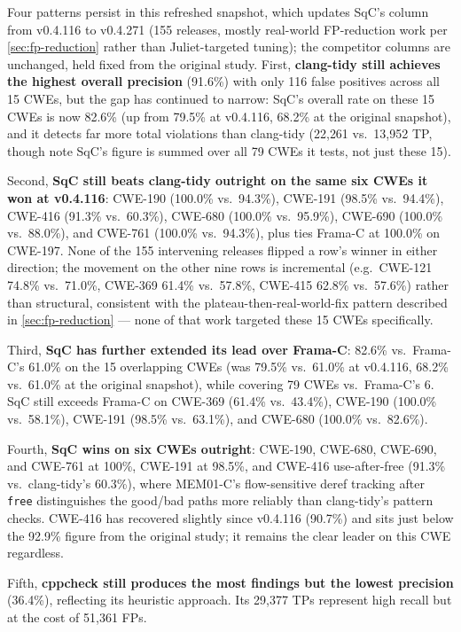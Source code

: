 Four patterns persist in this refreshed snapshot, which updates SqC's
column from v0.4.116 to v0.4.271 (155 releases, mostly real-world
FP-reduction work per \cref{sec:fp-reduction} rather than
Juliet-targeted tuning); the competitor columns are unchanged, held
fixed from the original study.  First, \textbf{clang-tidy still
achieves the highest overall precision} (91.6\%) with only 116 false
positives across all 15 CWEs, but the gap has continued to narrow:
SqC's overall rate on these 15 CWEs is now 82.6\% (up from 79.5\% at
v0.4.116, 68.2\% at the original snapshot), and it detects far more
total violations than clang-tidy (22{,}261 vs.\ 13{,}952 TP, though
note SqC's figure is summed over all 79 CWEs it tests, not just these
15).

Second, \textbf{SqC still beats clang-tidy outright on the same six
CWEs it won at v0.4.116}: CWE-190 (100.0\% vs.\ 94.3\%), CWE-191
(98.5\% vs.\ 94.4\%), CWE-416 (91.3\% vs.\ 60.3\%), CWE-680 (100.0\%
vs.\ 95.9\%), CWE-690 (100.0\% vs.\ 88.0\%), and CWE-761 (100.0\% vs.\
94.3\%), plus ties Frama-C at 100.0\% on CWE-197.  None of the 155
intervening releases flipped a row's winner in either direction; the
movement on the other nine rows is incremental (e.g.\ CWE-121 74.8\%
vs.\ 71.0\%, CWE-369 61.4\% vs.\ 57.8\%, CWE-415 62.8\% vs.\ 57.6\%)
rather than structural, consistent with the plateau-then-real-world-fix
pattern described in \cref{sec:fp-reduction} --- none of that work
targeted these 15 CWEs specifically.

Third, \textbf{SqC has further extended its lead over Frama-C}: 82.6\%
vs.\ Frama-C's 61.0\% on the 15 overlapping CWEs (was 79.5\% vs.\
61.0\% at v0.4.116, 68.2\% vs.\ 61.0\% at the original snapshot), while
covering 79 CWEs vs.\ Frama-C's 6.  SqC still exceeds Frama-C on
CWE-369 (61.4\% vs.\ 43.4\%), CWE-190 (100.0\% vs.\ 58.1\%), CWE-191
(98.5\% vs.\ 63.1\%), and CWE-680 (100.0\% vs.\ 82.6\%).

Fourth, \textbf{SqC wins on six CWEs outright}: CWE-190, CWE-680,
CWE-690, and CWE-761 at 100\%, CWE-191 at 98.5\%, and CWE-416
use-after-free (91.3\% vs.\ clang-tidy's 60.3\%), where MEM01-C's
flow-sensitive deref tracking after \texttt{free} distinguishes the
good/bad paths more reliably than clang-tidy's pattern checks.
CWE-416 has recovered slightly since v0.4.116 (90.7\%) and sits just
below the 92.9\% figure from the original study; it remains the clear
leader on this CWE regardless.

Fifth, \textbf{cppcheck still produces the most findings but the lowest
precision} (36.4\%), reflecting its heuristic approach.  Its 29{,}377
TPs represent high recall but at the cost of 51{,}361 FPs.


